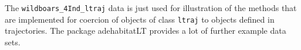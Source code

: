 \documentclass[12pt, oneside, a4paper]{scrbook}
\newcommand{\pkg}[1]{{\normalfont\fontseries{b}\selectfont #1}}
\let\code=\texttt
\begin{document}
\par\medskip

The \code{wildboars\_4Ind\_ltraj} data is just used for illustration of the methods that are implemented for coercion of objects of class \code{ltraj} to objects defined in \pkg{trajectories}.
The package \pkg{adehabitatLT} provides a lot of further example data sets.
\par\medskip









% 

% 
\end{document}
